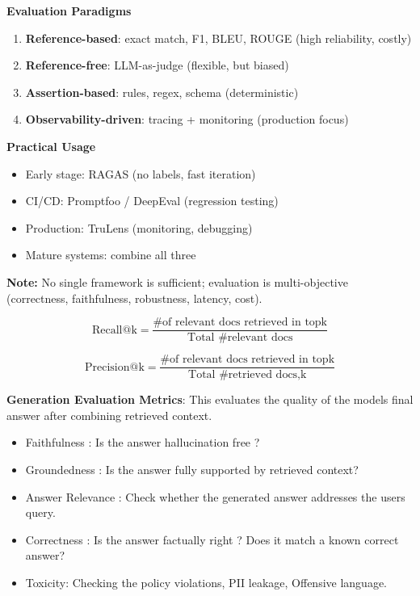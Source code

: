 \documentclass[10pt,a4paper]{article}
\begin{document}
\vspace{0.5em}
\noindent
\textbf{Evaluation Paradigms}
\begin{enumerate}
\item \textbf{Reference-based}: exact match, F1, BLEU, ROUGE (high reliability, costly)
\item \textbf{Reference-free}: LLM-as-judge (flexible, but biased)
\item \textbf{Assertion-based}: rules, regex, schema (deterministic)
\item \textbf{Observability-driven}: tracing + monitoring (production focus)
\end{enumerate}

\vspace{0.5em}
\noindent
\textbf{Practical Usage}
\begin{itemize}
\item Early stage: RAGAS (no labels, fast iteration)
\item CI/CD: Promptfoo / DeepEval (regression testing)
\item Production: TruLens (monitoring, debugging)
\item Mature systems: combine all three
\end{itemize}

\noindent
\textbf{Note:} No single framework is sufficient; evaluation is multi-objective (correctness, faithfulness, robustness, latency, cost).


\[
\text{Recall@k} = \frac{\text{\# of relevant docs retrieved in topk}}{\text{Total \# relevant docs}}
\]

\[
\text{Precision@k} = \frac{\text{\# of relevant docs retrieved in topk}}{\text{Total \# retrieved docs,k}}
\]

\textbf{Generation Evaluation Metrics}: This evaluates the quality of the models\textquotesingle{} final answer after combining retrieved context.

\begin{itemize}

\item
  Faithfulness : Is the answer hallucination free ?
\item
  Groundedness : Is the answer fully supported by retrieved context?
\item
  Answer Relevance : Check whether the generated answer addresses the user\textquotesingle s query.
\item
  Correctness : Is the answer factually right ? Does it match a known correct answer?
\item
  Toxicity: Checking the policy violations, PII leakage, Offensive language.
\end{itemize}
\end{document}
